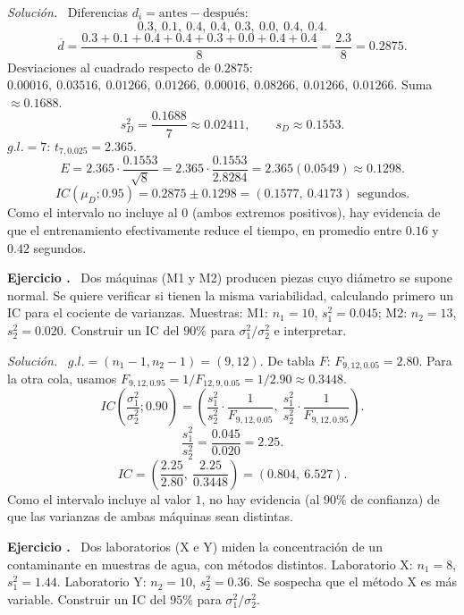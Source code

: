 \documentclass[11pt,a4paper]{article}
\newcounter{ejnum}
\newenvironment{ejercicio}{\refstepcounter{ejnum}\par\medskip\noindent\textbf{Ejercicio \theejnum.}~}{\par}
\newenvironment{solucion}{\par\noindent\textit{Solución.}~}{\par\vspace{1em}}
\begin{document}
\begin{solucion}
Diferencias $d_i = \text{antes}-\text{después}$:
\[
0.3,\ 0.1,\ 0.4,\ 0.4,\ 0.3,\ 0.0,\ 0.4,\ 0.4.
\]
\[
\overline d = \frac{0.3+0.1+0.4+0.4+0.3+0.0+0.4+0.4}{8} = \frac{2.3}{8} = 0.2875.
\]
Desviaciones al cuadrado respecto de $0.2875$: $0.00016,\ 0.03516,\ 0.01266,\ 0.01266,\ 0.00016,\ 0.08266,\ 0.01266,\ 0.01266$. Suma $\approx 0.1688$.
\[
s_D^2 = \frac{0.1688}{7} \approx 0.02411, \qquad s_D \approx 0.1553.
\]
$g.l.=7$: $t_{7,0.025}=2.365$.
\[
E = 2.365\cdot\frac{0.1553}{\sqrt 8} = 2.365\cdot\frac{0.1553}{2.8284} = 2.365(0.0549) \approx 0.1298.
\]
\[
IC(\mu_D;0.95) = 0.2875\pm 0.1298 = (0.1577,\ 0.4173) \text{ segundos}.
\]
Como el intervalo no incluye al $0$ (ambos extremos positivos), hay evidencia de que el entrenamiento efectivamente reduce el tiempo, en promedio entre $0.16$ y $0.42$ segundos.
\end{solucion}

\begin{ejercicio}
Dos máquinas (M1 y M2) producen piezas cuyo diámetro se supone normal. Se quiere verificar si tienen la misma variabilidad, calculando primero un IC para el cociente de varianzas. Muestras: M1: $n_1=10$, $s_1^2=0.045$; M2: $n_2=13$, $s_2^2=0.020$. Construir un IC del $90\%$ para $\sigma_1^2/\sigma_2^2$ e interpretar.
\end{ejercicio}

\begin{solucion}
$g.l.=(n_1-1,n_2-1)=(9,12)$. De tabla $F$: $F_{9,12,0.05}=2.80$. Para la otra cola, usamos $F_{9,12,0.95}=1/F_{12,9,0.05}=1/2.90\approx 0.3448$.
\[
IC\left(\frac{\sigma_1^2}{\sigma_2^2};0.90\right) = \left(\frac{s_1^2}{s_2^2}\cdot\frac{1}{F_{9,12,0.05}},\ \frac{s_1^2}{s_2^2}\cdot\frac{1}{F_{9,12,0.95}}\right).
\]
\[
\frac{s_1^2}{s_2^2} = \frac{0.045}{0.020} = 2.25.
\]
\[
IC = \left(\frac{2.25}{2.80},\ \frac{2.25}{0.3448}\right) = (0.804,\ 6.527).
\]
Como el intervalo incluye al valor $1$, no hay evidencia (al $90\%$ de confianza) de que las varianzas de ambas máquinas sean distintas.
\end{solucion}

\begin{ejercicio}
Dos laboratorios (X e Y) miden la concentración de un contaminante en muestras de agua, con métodos distintos. Laboratorio X: $n_1=8$, $s_1^2=1.44$. Laboratorio Y: $n_2=10$, $s_2^2=0.36$. Se sospecha que el método X es más variable. Construir un IC del $95\%$ para $\sigma_1^2/\sigma_2^2$.
\end{ejercicio}
\end{document}
